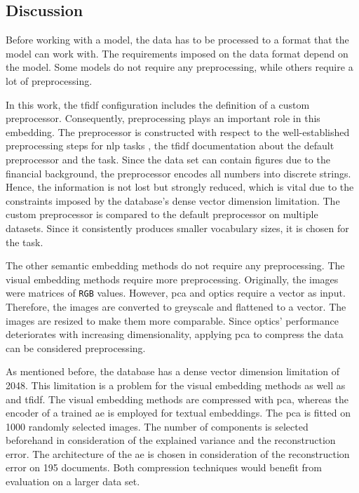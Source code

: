 \subsection{Discussion}\label{subsec:discussion}

Before working with a model, the data has to be processed to a format that the model can work with.
The requirements imposed on the data format depend on the model.
Some models do not require any preprocessing, while others require a lot of preprocessing.

In this work, the \ac{tfidf} configuration includes the definition of a custom preprocessor.
Consequently, preprocessing plays an important role in this embedding.
The preprocessor is constructed with respect to the well-established preprocessing steps for \ac{nlp} tasks \cite{nlp-book2009},
the \ac{tfidf} documentation about the default preprocessor and the task.
Since the data set can contain figures due to the financial background, the preprocessor encodes all numbers into discrete strings.
Hence, the information is not lost but strongly reduced, which is vital due to the constraints imposed 
by the database's dense vector dimension limitation.
The custom preprocessor is compared to the default preprocessor on multiple datasets.
Since it consistently produces smaller vocabulary sizes, it is chosen for the task.

The other semantic embedding methods do not require any preprocessing.
The visual embedding methods require more preprocessing.
Originally, the images were matrices of \texttt{RGB} values.
However, \ac{pca} and \ac{optics} require a vector as input.
Therefore, the images are converted to greyscale and flattened to a vector.
The images are resized to make them more comparable.
Since \ac{optics}' performance deteriorates with increasing dimensionality, 
applying \ac{pca} to compress the data can be considered preprocessing.


As mentioned before, the database has a dense vector dimension limitation of 2048.
This limitation is a problem for the visual embedding methods as well as \infersent{} and 
\ac{tfidf}.
The visual embedding methods are compressed with \ac{pca}, 
whereas the encoder of a trained \ac{ae} is employed for textual embeddings.
The \ac{pca} is fitted on 1000 randomly selected images.
The number of components is selected beforehand in consideration of the explained variance and the reconstruction error.
The architecture of the \ac{ae} is chosen in consideration of the reconstruction error on 195 documents.
Both compression techniques would benefit from evaluation on a larger data set.


